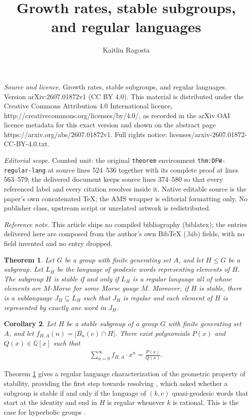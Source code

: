 \documentclass[10pt,a4paper]{amsart}
\newtheorem{thmx}{Theorem}
\newtheorem{corx}[thmx]{Corollary}
\begin{document}
\title[Growth rates, stable subgroups, and regular languages]{Growth rates, stable subgroups, and regular languages}
\author{Kaitlin Ragosta}
\date{}
\maketitle
\noindent\emph{Source and licence.} Growth rates, stable subgroups, and regular languages. Version arXiv:2607.01872v1 (CC BY 4.0). This material is distributed under the Creative Commons Attribution 4.0 International licence, http://creativecommons.org/licenses/by/4.0/, as recorded in the arXiv OAI licence metadata for this exact version and shown on the abstract page https://arxiv.org/abs/2607.01872v1. Full rights notice: licenses/arxiv-2607.01872-CC-BY-4.0.txt.\par\smallskip
\noindent\textit{Editorial scope.} Counted unit: the original \texttt{theorem} environment \texttt{thm:DFW-regular-lang} at source lines 524--536 together with its complete proof at lines 563--579; the delivered document keeps source lines 374--580 so that every referenced label and every citation resolves inside it. Native editable source is the paper's own concatenated TeX; the AMS wrapper is editorial formatting only. No publisher class, upstream script or unrelated artwork is redistributed.
\par\smallskip\noindent\textit{Reference note.} This article ships no compiled bibliography (biblatex); the entries delivered here are composed from the author's own BibTeX (.bib) fields, with no field invented and no entry dropped.
\begin{thmx}\label{thm:regular-language}
        Let $G$ be a group with finite generating set $A$, and let $H \leq G$ be a subgroup. Let $L_H$ be the language of geodesic words representing elements of $H$. The subgroup $H$ is stable if and only if $L_H$ is a regular language all of whose elements are $M$-Morse for some Morse gauge $M$. Moreover, if $H$ is stable, there is a sublanguage $J_H \subseteq L_H$ such that $J_H$ is regular and each element of $H$ is represented by exactly one word in $J_H$. 
\end{thmx}
\begin{corx}\label{corx:rational-growth}
    Let $H$ be a stable subgroup of a group $G$ with finite generating set $A$, and let $f_{H,A}(n) = |B_n(e) \cap H|$. There exist polynomials $P(x)$ and $Q(x) \in \mathbb{Q}[x]$ such that 
    \begin{align*}
        \sum_{n=0}^{\infty} f_{H,A} \cdot x^n = \frac{P(x)}{Q(x)}\text{.}
    \end{align*}
\end{corx}
Theorem \ref{thm:regular-language} gives a regular language characterization of the geometric property of stability, providing the first step towards resolving \cite[Question~1]{CRSZ}, which asked whether a subgroup is stable if and only if the language of $(k,c)$ quasi-geodesic words that start at the identity and end in $H$ is regular whenever $k$ is rational. This is the case for hyperbolic groups \cite{Holt-Rees-qgeod-regular,Sam-Patrick-Davide-qgeod-regular}. 
\end{document}
